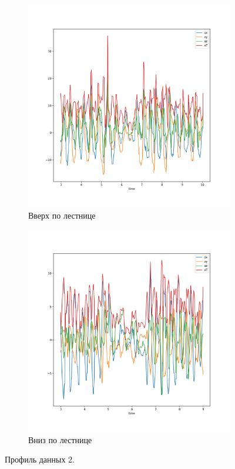 \documentclass[12pt, fleqn, unicode]{article}
\begin{document}
\begin{figure}
    \begin{subfigure}[b]{0.5\textwidth}
        \centering
        \includegraphics[width=.9\linewidth]{../pics/raw_go_up.png}
        \caption{Вверх по лестнице}
        \label{fig:sfig1}
    \end{subfigure}%
    \begin{subfigure}[b]{0.5\textwidth}
        \centering
        \includegraphics[width=.9\linewidth]{../pics/raw_go_down.png}
        \caption{Вниз по лестнице}
        \label{fig:sfig2}
    \end{subfigure}
    \caption{Профиль данных 2.}
    \label{fig:fig}
\end{figure}
\end{document}

